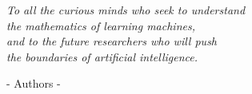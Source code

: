 \newpage
\thispagestyle{empty}

\vspace*{4cm}

\begin{center}
    \Large\textit{
        To all the curious minds who seek to understand\\
        the mathematics of learning machines,\\
        and to the future researchers who will push\\
        the boundaries of artificial intelligence.
    }
\end{center}

\vspace{3cm}

\begin{flushright}
    \Large - Authors -
\end{flushright}

\newpage
